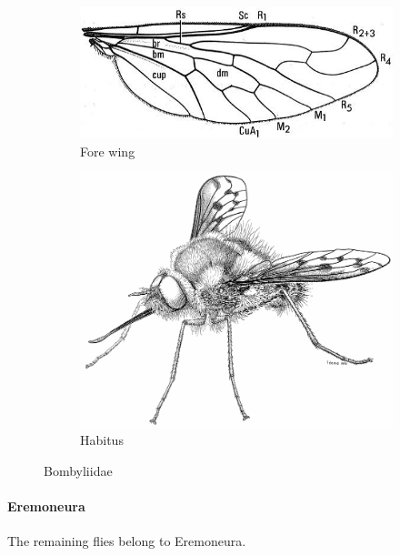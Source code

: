\documentclass[letterpaper, 11pt]{article}
\begin{document}
\begin{figure}[ht!]
    \centering
    \begin{subfigure}[ht!]{0.45\textwidth}
        \includegraphics[width=\textwidth]{BombyliidWing}
        \caption{Fore wing \citep[][Fig. 45.1]{mcalpine1981manual}}
        \label{fig:bombyl2}
    \end{subfigure}
    \qquad 
    \begin{subfigure}[ht!]{0.4\textwidth}
        \includegraphics[width=\textwidth]{BombyliidHabitus}
        \caption{Habitus \citep[][Fig. 45.1]{mcalpine1981manual}}
        \label{fig:bombyl1}
    \end{subfigure}
    \caption{Bombyliidae}\label{fig:bombyls}
\end{figure}

\paragraph{Eremoneura} The remaining flies belong to Eremoneura.
\end{document}
